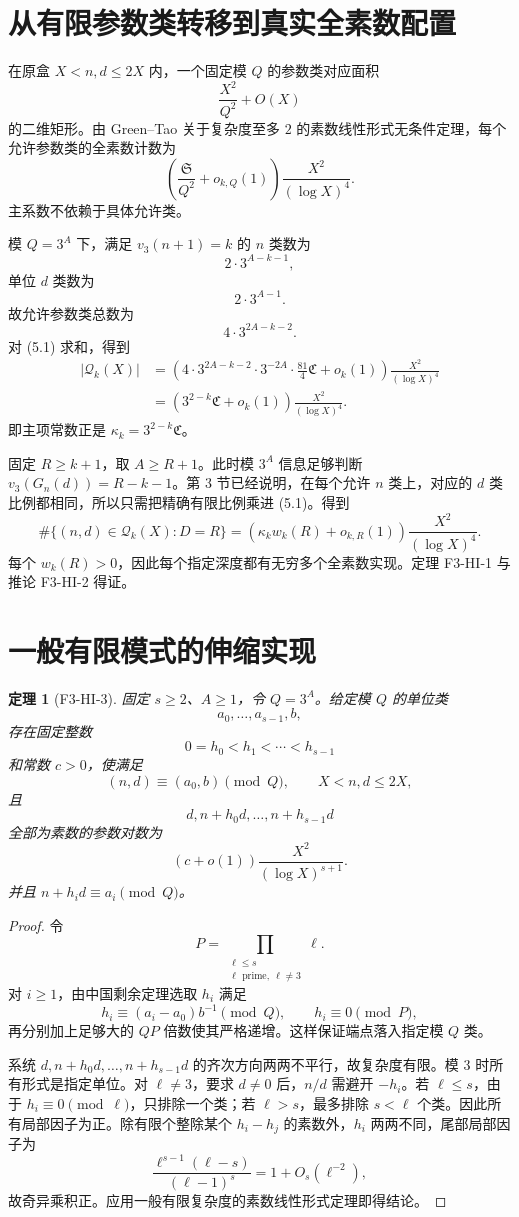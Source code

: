 \documentclass[11pt,a4paper]{ctexart}
\newtheorem{theorem}{定理}
\newcommand{\vthree}{v_3}
\newcommand{\Qk}{\mathcal Q_k}
\newcommand{\Cfrak}{\mathfrak C}
\begin{document}
\section{从有限参数类转移到真实全素数配置}
在原盒 $X<n,d\le2X$ 内，一个固定模 $Q$ 的参数类对应面积
\[
\frac{X^2}{Q^2}+O(X)
\]
的二维矩形。由 Green--Tao 关于复杂度至多 $2$ 的素数线性形式无条件定理，每个允许参数类的全素数计数为
\[
\left(\frac{\mathfrak S}{Q^2}+o_{k,Q}(1)\right)
\frac{X^2}{(\log X)^4}. \tag{5.1}
\]
主系数不依赖于具体允许类。

模 $Q=3^A$ 下，满足 $\vthree(n+1)=k$ 的 $n$ 类数为
\[
2\cdot3^{A-k-1},
\]
单位 $d$ 类数为
\[
2\cdot3^{A-1}.
\]
故允许参数类总数为
\[
4\cdot3^{2A-k-2}. \tag{5.2}
\]
对 (5.1) 求和，得到
\[
\begin{aligned}
|\Qk(X)|
&=\left(
4\cdot3^{2A-k-2}\cdot3^{-2A}\cdot\frac{81}{4}\Cfrak+o_k(1)
\right)
\frac{X^2}{(\log X)^4}\\
&=(3^{2-k}\Cfrak+o_k(1))\frac{X^2}{(\log X)^4}.
\end{aligned}
\]
即主项常数正是 $\kappa_k=3^{2-k}\Cfrak$。

固定 $R\ge k+1$，取 $A\ge R+1$。此时模 $3^A$ 信息足够判断 $\vthree(G_n(d))=R-k-1$。第 3 节已经说明，在每个允许 $n$ 类上，对应的 $d$ 类比例都相同，所以只需把精确有限比例乘进 (5.1)。得到
\[
\#\{(n,d)\in\Qk(X):D=R\}
=
(\kappa_kw_k(R)+o_{k,R}(1))\frac{X^2}{(\log X)^4}.
\]
每个 $w_k(R)>0$，因此每个指定深度都有无穷多个全素数实现。定理 F3-HI-1 与推论 F3-HI-2 得证。

\section{一般有限模式的伸缩实现}
\begin{theorem}[F3-HI-3]
固定 $s\ge2$、$A\ge1$，令 $Q=3^A$。给定模 $Q$ 的单位类
\[
a_0,\ldots,a_{s-1},b,
\]
存在固定整数
\[
0=h_0<h_1<\cdots<h_{s-1}
\]
和常数 $c>0$，使满足
\[
(n,d)\equiv(a_0,b)\pmod Q,\qquad X<n,d\le2X,
\]
且
\[
d,n+h_0d,\ldots,n+h_{s-1}d
\]
全部为素数的参数对数为
\[
(c+o(1))\frac{X^2}{(\log X)^{s+1}}.
\]
并且 $n+h_i d\equiv a_i\pmod Q$。
\end{theorem}

\begin{proof}
令
\[
P=\prod_{\substack{\ell\le s\\ \ell\text{ prime},\ \ell\ne3}}\ell.
\]
对 $i\ge1$，由中国剩余定理选取 $h_i$ 满足
\[
h_i\equiv(a_i-a_0)b^{-1}\pmod Q,
\qquad h_i\equiv0\pmod P,
\]
再分别加上足够大的 $QP$ 倍数使其严格递增。这样保证端点落入指定模 $Q$ 类。

系统 $d,n+h_0d,\ldots,n+h_{s-1}d$ 的齐次方向两两不平行，故复杂度有限。模 $3$ 时所有形式是指定单位。对 $\ell\ne3$，要求 $d\ne0$ 后，$n/d$ 需避开 $-h_i$。若 $\ell\le s$，由于 $h_i\equiv0\pmod\ell$，只排除一个类；若 $\ell>s$，最多排除 $s<\ell$ 个类。因此所有局部因子为正。除有限个整除某个 $h_i-h_j$ 的素数外，$h_i$ 两两不同，尾部局部因子为
\[
\frac{\ell^{s-1}(\ell-s)}{(\ell-1)^s}=1+O_s(\ell^{-2}),
\]
故奇异乘积正。应用一般有限复杂度的素数线性形式定理即得结论。
\end{proof}
\end{document}
